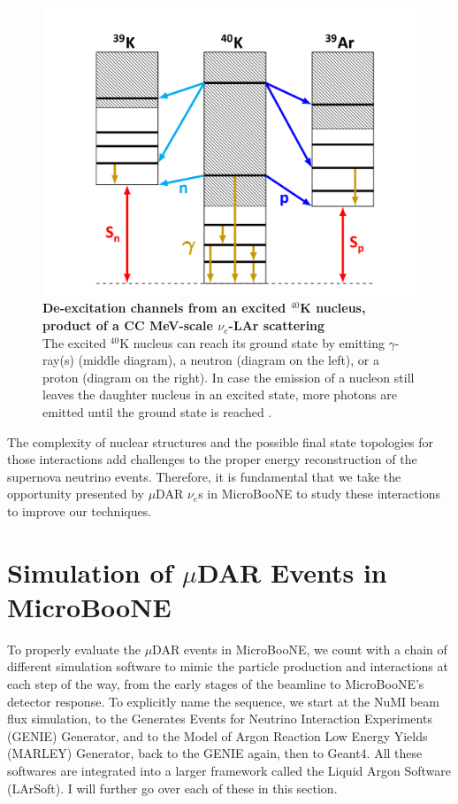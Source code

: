 \begin{figure}[h!]
    \centering
    \includegraphics[width=135mm]{Figures/40K_deexcitation.jpeg}
    \caption[De-excitation channels from an excited $^{40}$K nucleus, product of a CC MeV-scale $\nu_e$-LAr scattering]{{\textbf{De-excitation channels from an excited $^{40}$K nucleus, product of a CC MeV-scale $\nu_e$-LAr scattering}}\\  The excited $^{40}$K nucleus can reach its ground state by emitting $\gamma$-ray(s) (middle diagram), a neutron (diagram on the left), or a proton (diagram on the right). In case the emission of a nucleon still leaves the daughter nucleus in an excited state, more photons are emitted until the ground state is reached \cite{Gardiner_thesis}.}
    \label{40K_deexcite}
\end{figure}

The complexity of nuclear structures and the possible final state topologies for those interactions add challenges to the proper energy reconstruction of the supernova neutrino events. Therefore, it is fundamental that we take the opportunity presented by $\mu$DAR $\nu_e$s in MicroBooNE to study these interactions to improve our techniques. 


\section{Simulation of $\mu$DAR Events in MicroBooNE}

To properly evaluate the $\mu$DAR events in MicroBooNE, we count with a chain of different simulation software to mimic the particle production and interactions at each step of the way, from the early stages of the beamline to MicroBooNE's detector response. 
To explicitly name the sequence, we start at the NuMI beam flux simulation, to the Generates Events for Neutrino Interaction Experiments (GENIE) Generator, and to the Model of Argon Reaction Low Energy Yields (MARLEY) Generator, back to the GENIE again, then to Geant4. All these softwares are integrated into a larger framework called the Liquid Argon Software (LArSoft). I will further go over each of these in this section. 

